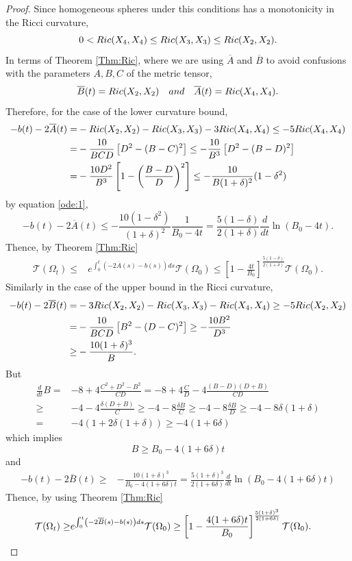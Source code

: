 \documentclass{amsart}
\theoremstyle{definition}
\theoremstyle{remark}
\begin{document}
\begin{proof}
Since homogeneous spheres under this conditions has a monotonicity in the Ricci curvature,
 $$
0<  {\rm Ric}(X_4,X_4)\leq   {\rm Ric}(X_3,X_3)\leq   {\rm Ric}(X_2,X_2).
 $$
In terms of Theorem \ref{Thm:Ric}, where we are using $\overline{A}$ and $\overline{B}$ to avoid confusions with the parameters $A,B,C$ of the metric tensor,  
 $$
\overline{B}(t)={\rm Ric}(X_2,X_2)\quad {\rm and} \quad \overline{A}(t)={\rm Ric}(X_4,X_4).
 $$
 Therefore, for the case of the lower curvature bound,
 $$
 \begin{aligned}
     -b(t)-2\overline{A}(t)=&-{\rm Ric}(X_2,X_2)-{\rm Ric}(X_3,X_3)-3{\rm Ric}(X_4,X_4)\leq -5{\rm Ric}(X_4,X_4)\\
     =& -\frac{10}{BCD}\left[D^2-(B-C)^2\right]\leq -\frac{10}{B^3}\left[D^2-(B-D)^2\right]\\
     =&-\frac{10D^2}{B^3}\left[1-\left(\frac{B-D}{D}\right)^2\right]\leq -\frac{10}{B(1+\delta)^2}(1-\delta^2)
 \end{aligned}
 $$
 by equation \eqref{ode:1},
 $$
 -b(t)-2\overline
{A}(t)\leq -\frac{10(1-\delta^2)}{(1+\delta)^2}\frac{1}{B_0-4t}=\frac{5(1-\delta)}{2(1+\delta)}\frac{d}{dt}\ln\left(B_0-4t\right).
 $$
 Thence, by Theorem \ref{Thm:Ric}
$$
\begin{aligned}
\mathcal{T}(\Omega_t)\leq& e^{\int_0^t\left(-2 \overline{A}(s)-b(s)\right)ds}\mathcal{T}(\Omega_0)\leq  \left[1-\frac{4t}{B_0}\right]^{\frac{5(1-\delta)}{2(1+\delta)}}\mathcal{T}(\Omega_0).
\end{aligned}
$$
 Similarly in the case of the upper bound in the Ricci curvature,
 $$
 \begin{aligned}
     -b(t)-2\overline{B}(t)=&-3{\rm Ric}(X_2,X_2)-{\rm Ric}(X_3,X_3)-{\rm Ric}(X_4,X_4)\geq -5{\rm Ric}(X_2,X_2)\\
     =& -\frac{10}{BCD}\left[B^2-(D-C)^2\right]\geq -\frac{10B^2}{D^3}\\
     \geq&-\frac{10(1+\delta)^3}{B}.
 \end{aligned}
 $$
But
$$
\begin{aligned}
    \frac{d}{dt}B=& -8+4\frac{C^2+D^2-B^2}{CD}=-8+4\frac{C}{D}-4\frac{(B-D)(D+B)}{CD}\\
    \geq&-4-4\frac{\delta(D+B)}{C} \geq -4-8\frac{\delta B}{C}\geq-4-8\frac{\delta B}{D}  \geq-4-8\delta(1+\delta)\\
    =&-4(1+2\delta(1+\delta)) \geq -4(1+6\delta) 
\end{aligned}
$$
which implies
$$
B\geq B_0-4(1+6\delta)t
$$
and
 $$
 \begin{aligned}
     -b(t)-2\overline{B}(t)
     \geq&-\frac{10(1+\delta)^3}{B_0-4(1+6\delta)t}=\frac{5(1+\delta)^3}{2(1+6\delta)}\frac{d}{dt}\ln\left(B_0-4(1+6\delta)t\right)
 \end{aligned}
 $$
 Thence, by using Theorem \ref{Thm:Ric}
$$
\begin{aligned}
\mathcal{T}(\Omega_t)\geq& e^{\int_0^t\left(-2 \overline{B}(s)-b(s)\right)ds}\mathcal{T}(\Omega_0)\geq  \left[1-\frac{4(1+6\delta)t}{B_0}\right]^{\frac{5(1+\delta)^3}{2(1+6\delta)}}\mathcal{T}(\Omega_0).  \mbox{\qedhere}
\end{aligned}
$$

 
\end{proof}
\end{document}
